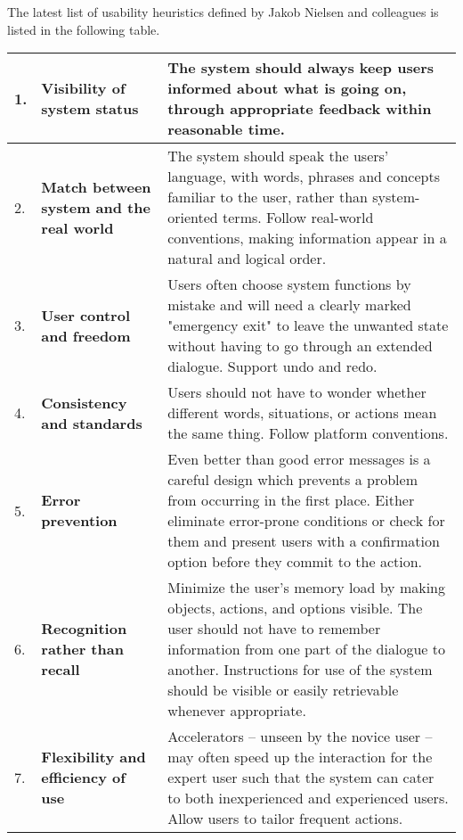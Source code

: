 The latest list of usability heuristics defined by Jakob Nielsen and colleagues \citep{NielsenMack} is listed in the following table. 
\clearpage
\begin{longtable}{|p{0.4cm} | p{5cm}|p{8cm}|}

 \hline
1. &\textbf{Visibility of system status} & The system should always keep users informed about what is going on, through appropriate feedback within reasonable time. \\ \hline

2. &\textbf{Match between system and the real world} & The system should speak the users' language, with words, phrases and concepts familiar to the user, rather than system-oriented terms. Follow real-world conventions, making information appear in a natural and logical order. \\ \hline

3. &\textbf{User control and freedom} & Users often choose system functions by mistake and will need a clearly marked "emergency exit" to leave the unwanted state without having to go through an extended dialogue. Support undo and redo.\\ \hline

4.& \textbf{Consistency and standards} & Users should not have to wonder whether different words, situations, or actions mean the same thing. Follow platform conventions. \\ \hline

5.& \textbf{Error prevention} & Even better than good error messages is a careful design which prevents a problem from occurring in the first place. Either eliminate error-prone conditions or check for them and present users with a confirmation option before they commit to the action.\\ \hline

6.& \textbf{Recognition rather than recall} & Minimize the user's memory load by making objects, actions, and options visible. The user should not have to remember information from one part of the dialogue to another. Instructions for use of the system should be visible or easily retrievable whenever appropriate.\\ \hline


7.& \textbf{Flexibility and efficiency of use} & Accelerators -- unseen by the novice user -- may often speed up the interaction for the expert user such that the system can cater to both inexperienced and experienced users. Allow users to tailor frequent actions.\\ \hline


\end{longtable}
